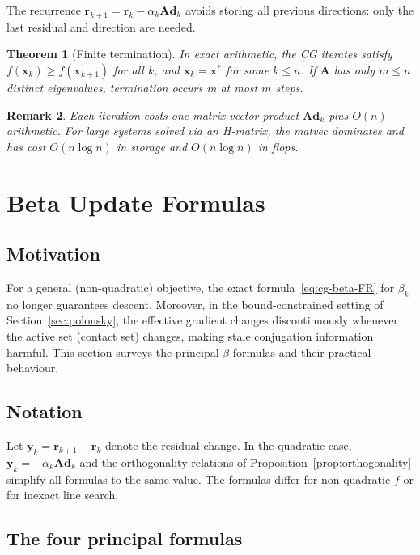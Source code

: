 \documentclass[11pt,a4paper]{article}
\newtheorem{theorem}{Theorem}[section]
\newtheorem{remark}[theorem]{Remark}
\newcommand{\bA}{\mathbf{A}}
\newcommand{\br}{\mathbf{r}}
\newcommand{\bd}{\mathbf{d}}
\newcommand{\bx}{\mathbf{x}}
\newcommand{\by}{\mathbf{y}}
\begin{document}
The recurrence $\br_{k+1} = \br_k - \alpha_k\bA\bd_k$ avoids storing all previous directions:
only the last residual and direction are needed.

\begin{theorem}[Finite termination]
  \label{thm:finite}
  In exact arithmetic, the CG iterates satisfy $f(\bx_k) \geq f(\bx_{k+1})$ for all $k$,
  and $\bx_k = \bx^*$ for some $k \leq n$.
  If $\bA$ has only $m \leq n$ distinct eigenvalues, termination occurs in at most $m$ steps.
\end{theorem}

\begin{remark}
  Each iteration costs one matrix-vector product $\bA\bd_k$ plus $O(n)$ arithmetic.
  For large systems solved via an H-matrix, the matvec dominates and has cost
  $O(n \log n)$ in storage and $O(n \log n)$ in flops.
\end{remark}

\section{Beta Update Formulas}
\label{sec:beta}

\subsection{Motivation}

For a general (non-quadratic) objective, the exact formula~\eqref{eq:cg-beta-FR}
for $\beta_k$ no longer guarantees descent.  Moreover, in the bound-constrained
setting of Section~\ref{sec:polonsky}, the effective gradient changes discontinuously
whenever the active set (contact set) changes, making stale conjugation information
harmful.  This section surveys the principal $\beta$ formulas and their practical behaviour.

\subsection{Notation}

Let $\by_k = \br_{k+1} - \br_k$ denote the residual change.  In the quadratic case,
$\by_k = -\alpha_k\bA\bd_k$ and the orthogonality relations of
Proposition~\ref{prop:orthogonality} simplify all formulas to the same value.
The formulas differ for non-quadratic $f$ or for inexact line search.

\subsection{The four principal formulas}
\end{document}

